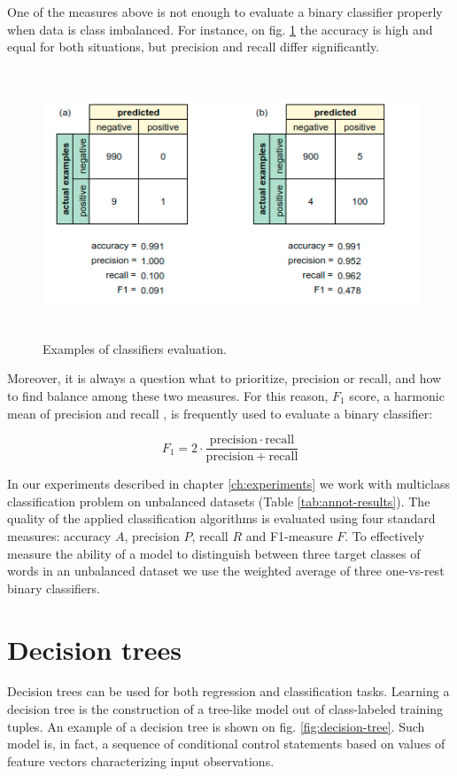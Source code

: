 One of the measures above is not enough to evaluate a binary classifier properly when data is class imbalanced. For instance, on fig. \ref{fig:classifiers-evaluation} the accuracy is high and equal for both situations, but precision and recall differ significantly. 

\begin{figure}[h]
    \centering
    \includegraphics[height=8cm]{Images/Classifiers-evaluation.png}
    \caption{Examples of classifiers evaluation.}
    \label{fig:classifiers-evaluation}
\end{figure}

Moreover, it is always a question what to prioritize, precision or recall, and how to find balance among these two measures. For this reason, $F_1$ score, a harmonic mean of precision and recall \citep{Chinchor-1992}, is frequently used to evaluate a binary classifier:

\begin{equation}
    F_{1}=2\cdot {\frac {\mathrm {precision} \cdot \mathrm {recall} }{\mathrm {precision} +\mathrm {recall} }}
\end{equation} 

In our experiments described in chapter \ref{ch:experiments} we work with multiclass classification problem on unbalanced datasets (Table \ref{tab:annot-results}). The quality of the applied classification algorithms is evaluated using four standard measures: accuracy $A$, precision $P$, recall $R$ and F1-measure $F$. To effectively measure the ability of a model to distinguish between three target classes of words in an unbalanced dataset we use the weighted average of three one-vs-rest binary classifiers. 

\section{Decision trees}
Decision trees can be used for both regression and classification tasks. Learning a decision tree is the construction of a tree-like model out of class-labeled training tuples. An example of a decision tree is shown on fig. \ref{fig:decision-tree}. Such model is, in fact, a sequence of conditional control statements based on values of feature vectors characterizing input observations. 

